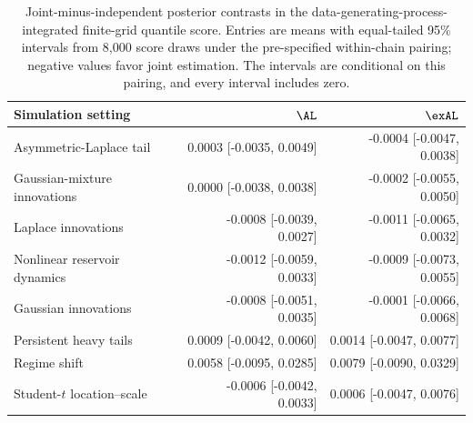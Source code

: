 \begin{table}[!htbp]
\centering
\small
\begin{tabular}{@{}>{\raggedright\arraybackslash}p{}rr@{}}
\toprule
Simulation setting & \(\AL\) & \(\exAL\) \\
\midrule
Asymmetric-Laplace tail & 0.0003 [-0.0035, 0.0049] & -0.0004 [-0.0047, 0.0038] \\
Gaussian-mixture innovations & 0.0000 [-0.0038, 0.0038] & -0.0002 [-0.0055, 0.0050] \\
Laplace innovations & -0.0008 [-0.0039, 0.0027] & -0.0011 [-0.0065, 0.0032] \\
Nonlinear reservoir dynamics & -0.0012 [-0.0059, 0.0033] & -0.0009 [-0.0073, 0.0055] \\
Gaussian innovations & -0.0008 [-0.0051, 0.0035] & -0.0001 [-0.0066, 0.0068] \\
Persistent heavy tails & 0.0009 [-0.0042, 0.0060] & 0.0014 [-0.0047, 0.0077] \\
Regime shift & 0.0058 [-0.0095, 0.0285] & 0.0079 [-0.0090, 0.0329] \\
Student-\(t\) location--scale & -0.0006 [-0.0042, 0.0033] & 0.0006 [-0.0047, 0.0076] \\
\bottomrule
\end{tabular}
\caption{Joint-minus-independent posterior contrasts in the data-generating-process-integrated finite-grid quantile score. Entries are means with equal-tailed 95\% intervals from 8,000 score draws under the pre-specified within-chain pairing; negative values favor joint estimation. The intervals are conditional on this pairing, and every interval includes zero.}
\label{tab:supp-joint-qdesn-dgp-score-contrasts}
\end{table}
